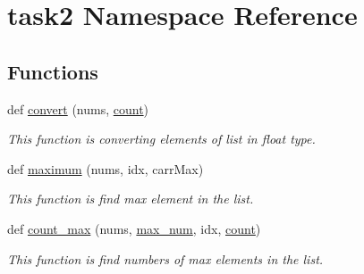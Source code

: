\hypertarget{namespacetask2}{}\section{task2 Namespace Reference}
\label{namespacetask2}
\subsection*{Functions}
\begin{DoxyCompactItemize}
\item 
def \hyperlink{namespacetask2_a6698f7ee88d947ca7895225fc6ed9aad}{convert} (nums, \hyperlink{namespacetask2_acffac0045062e2fa5bd88e9d7303e0e4}{count})
\begin{DoxyCompactList}\small\item\em This function is converting elements of list in float type. \end{DoxyCompactList}\item 
def \hyperlink{namespacetask2_aa94c3ce489fe794dd806b09fe421e570}{maximum} (nums, idx, carr\+Max)
\begin{DoxyCompactList}\small\item\em This function is find max element in the list. \end{DoxyCompactList}\item 
def \hyperlink{namespacetask2_a1003a8330a59d03e5b6bad23dbc3c2f8}{count\+\_\+max} (nums, \hyperlink{namespacetask2_a6be05602bf574a03f0308429ac474e97}{max\+\_\+num}, idx, \hyperlink{namespacetask2_acffac0045062e2fa5bd88e9d7303e0e4}{count})
\begin{DoxyCompactList}\small\item\em This function is find numbers of max elements in the list. \end{DoxyCompactList}\end{DoxyCompactItemize}
